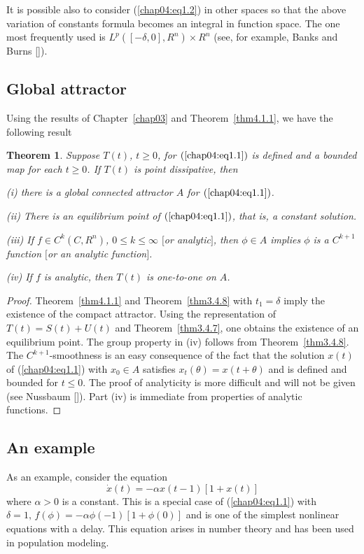 \documentclass{surv-l}
\theoremstyle{plain}
\newtheorem{theorem}{Theorem}[section]
\theoremstyle{definition}
\numberwithin{equation}{section}
\numberwithin{figure}{chapter}
\begin{document}
It is possible also to consider (\ref{chap04:eq1.2}) in other spaces so that the above variation of constants formula becomes an integral in function space. The one most frequently used is $L^{p}([-\delta, 0], R^{n})\times R^{n}$ (see, for example, Banks and Burns [\citeyear{1975bb}]).

\subsection{Global attractor}\label{subsec4.1.2} Using the results of Chapter~\ref{chap03} and Theorem~\ref{thm4.1.1}, we have the following result

\begin{theorem}\label{thm4.1.2}
Suppose $T(t)$, $t\geq 0$, for $(\ref{chap04:eq1.1})$ is defined and a bounded map for each $t\geq 0$. If $T(t)$ is point dissipative, then

\emph{(i)} there is a global connected attractor $A$ for $(\ref{chap04:eq1.1})$.

\emph{(ii)} There is an equilibrium point of $(\ref{chap04:eq1.1})$, that is, a constant solution.

\emph{(iii)} If $f\in C^{k}(C, R^{n})$, $ 0\leq k\leq\infty$ $[$or analytic$]$, then $\phi \in A$ implies $\phi$ is a $C^{k+1}$ function $[$or an analytic function$]$.

\emph{(iv)} If $f$ is analytic, then $T(t)$ is one-to-one on $A$.
\end{theorem}

\begin{proof}
Theorem~\ref{thm4.1.1} and Theorem~\ref{thm3.4.8} with $ t_{1}=\delta$ imply the existence of the compact attractor. Using the representation of $T(t)=S(t)+U(t)$ and Theorem~\ref{thm3.4.7}, one obtains the existence of an equilibrium point. The group property in (iv) follows from Theorem~\ref{thm3.4.8}. The $C^{k+1}$-smoothness is an easy consequence of the fact that the solution $x(t)$ of (\ref{chap04:eq1.1}) with $x_{0}\in A$ satisfies $x_{t}(\theta)=x(t+\theta)$ and is defined and bounded for $t\leq 0$. The proof of analyticity is more difficult and will not be given (see Nussbaum [\citeyear{1973n}]). Part (iv) is immediate from properties of analytic functions.
\end{proof}

\subsection{An example}\label{subsec4.1.3} As an example, consider the equation
\begin{equation}\label{chap04:eq1.3}
\dot{x}(t)=-\alpha x(t-1)[1+x(t)]
\end{equation}
where $\alpha>0$ is a constant. This is a special case of (\ref{chap04:eq1.1}) with $\delta=1,\, f(\phi)= -\alpha\phi(-1)[1+\phi(0)]$ and is one of the simplest nonlinear equations with a delay. This equation arises in number theory and has been used in population modeling.
\end{document}
